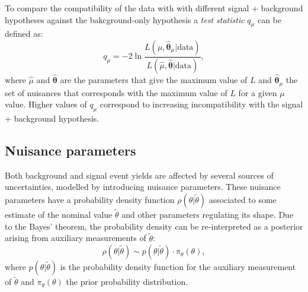 \documentclass[../main.tex]{subfiles}
\begin{document}
To compare the compatibility of the data with  with different signal + background hypotheses against the bakcground-only hypothesis a \textit{test statistic} $q_\mu$ can be defined as:
\begin{equation}
q_\mu = -2 \ln \frac{L(\mu, \boldsymbol{\hat{\theta}}_\mu | \text{data})}{L(\hat{\mu}, \boldsymbol{\hat{\theta}} | \text{data})},
\end{equation}
where $\hat{\mu}$ and $\boldsymbol{\hat{\theta}}$ are the parameters that give the maximum value of $L$ and $\boldsymbol{\hat{\theta}}_\mu$ the set of nuisances that corresponds with the maximum value of $L$ for a given $\mu$ value. Higher values of $q_\mu$ correspond to increasing incompatibility with the signal + background hypothesis.





\subsection{Nuisance parameters}

Both background and signal event yields are affected by several sources of uncertainties, modelled by introducing nuisance parameters. These nuisance parameters have a probability density function $\rho(\theta|\tilde{\theta})$ associated to some estimate of the nominal value $\tilde{\theta}$ and other parameters regulating its shape. Due to the Bayes' theorem, the probability density can be re-interpreted as a posterior arising from auxiliary measurements of $\tilde{\theta}$:
\begin{equation}
\rho(\theta|\tilde{\theta}) \sim p(\theta|\tilde{\theta}) \cdot \pi_\theta(\theta),
\end{equation}
where $p(\theta|\tilde{\theta})$ is the probability density function for the auxiliary measurement of $\tilde{\theta}$ and $\pi_\theta(\theta)$ the prior probability distribution.
\end{document}
